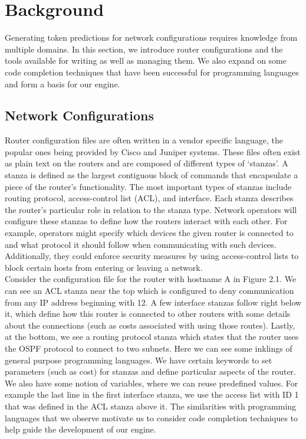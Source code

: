 \documentclass[../thesis.tex]{subfiles}
\begin{document}
\chapter{Background}
\label{ch:background}

Generating token predictions for network configurations requires knowledge from multiple domains. In this section, we introduce router configurations and the tools available for writing as well as managing them. We also expand on some code completion techniques that have been successful for programming languages and form a basis for our engine.

\section{Network Configurations} 

Router configuration files are often written in a vendor specific language, the popular ones being provided by Cisco and Juniper systems. These files often exist as plain text on the routers and are composed of different types of `stanzas'. A stanza is defined as the largest contiguous block of commands that encapsulate a piece of the router's functionality. The most important types of stanzas include routing protocol, access-control list (ACL), and interface. Each stanza describes the router's particular role in relation to the stanza type. Network operators will configure these stanzas to define how the routers interact with each other. For example, operators might specify which devices the given router is connected to and what protocol it should follow when communicating with such devices. Additionally, they could enforce security measures by using access-control lists to block certain hosts from entering or leaving a network.\\

 Consider the configuration file for the router with hostname A in Figure 2.1. We can see an ACL stanza near the top which is configured to deny communication from any IP address beginning with 12. A few interface stanzas follow right below it, which define how this router is connected to other routers with some details about the connections (such as costs associated with using those routes). Lastly, at the bottom, we see a routing protocol stanza which states that the router uses the OSPF protocol to connect to two subnets. Here we can see some inklings of general purpose programming languages. We have certain keywords to set parameters (such as cost) for stanzas and define particular aspects of the router. We also have some notion of variables, where we can reuse predefined values. For example the last line in the first interface stanza, we use the access list with ID 1 that was defined in the ACL stanza above it. The similarities with programming languages that we observe motivate us to consider code completion techniques to help guide the development of our engine.
\end{document}
